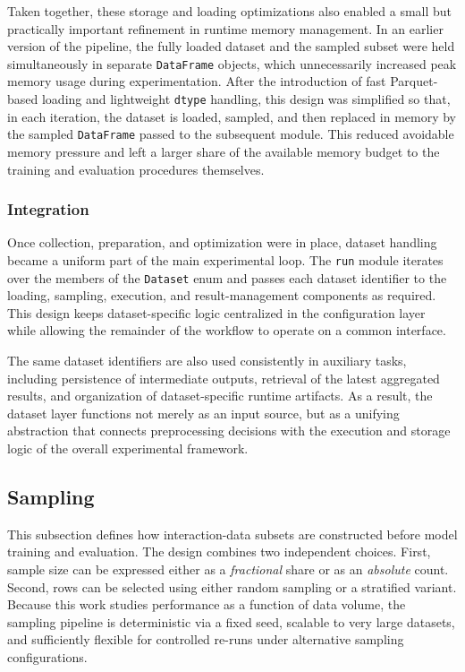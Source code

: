 \documentclass[12pt,a4paper]{article}
\begin{document}
Taken together, these storage and loading optimizations also enabled a small but practically important refinement in runtime memory management. In an earlier version of the pipeline, the fully loaded dataset and the sampled subset were held simultaneously in separate \texttt{DataFrame} objects, which unnecessarily increased peak memory usage during experimentation. After the introduction of fast Parquet-based loading and lightweight \texttt{dtype} handling, this design was simplified so that, in each iteration, the dataset is loaded, sampled, and then replaced in memory by the sampled \texttt{DataFrame} passed to the subsequent module. This reduced avoidable memory pressure and left a larger share of the available memory budget to the training and evaluation procedures themselves.

\subsubsection{Integration}
Once collection, preparation, and optimization were in place, dataset handling became a uniform part of the main experimental loop. The \texttt{run} module iterates over the members of the \texttt{Dataset} enum and passes each dataset identifier to the loading, sampling, execution, and result-management components as required. This design keeps dataset-specific logic centralized in the configuration layer while allowing the remainder of the workflow to operate on a common interface.

The same dataset identifiers are also used consistently in auxiliary tasks, including persistence of intermediate outputs, retrieval of the latest aggregated results, and organization of dataset-specific runtime artifacts. As a result, the dataset layer functions not merely as an input source, but as a unifying abstraction that connects preprocessing decisions with the execution and storage logic of the overall experimental framework.

\subsection{Sampling}
This subsection defines how interaction-data subsets are constructed before model training and evaluation. The design combines two independent choices. First, sample size can be expressed either as a \emph{fractional} share or as an \emph{absolute} count. Second, rows can be selected using either random sampling or a stratified variant. Because this work studies performance as a function of data volume, the sampling pipeline is deterministic via a fixed seed, scalable to very large datasets, and sufficiently flexible for controlled re-runs under alternative sampling configurations.
\end{document}
